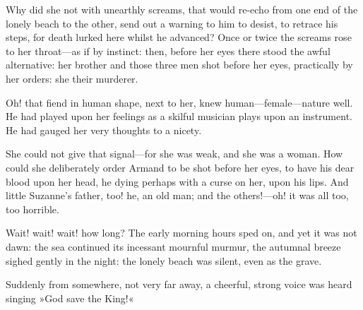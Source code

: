 Why did she not with unearthly screams, that would re-echo from one end of the lonely beach to the other, send out a warning to him to desist, to retrace his steps, for death lurked here whilst he advanced? Once or twice the screams rose to her throat—as if by instinct: then, before her eyes there stood the awful alternative: her brother and those three men shot before her eyes, practically by her orders: she their murderer.

Oh! that fiend in human shape, next to her, knew human—female—nature well. He had played upon her feelings as a skilful musician plays upon an instrument. He had gauged her very thoughts to a nicety.

She could not give that signal—for she was weak, and she was a woman. How could she deliberately order Armand to be shot before her eyes, to have his dear blood upon her head, he dying perhaps with a curse on her, upon his lips. And little Suzanne's father, too! he, an old man; and the others!—oh! it was all too, too horrible.

Wait! wait! wait! how long? The early morning hours sped on, and yet it was not dawn: the sea continued its incessant mournful murmur, the autumnal breeze sighed gently in the night: the lonely beach was silent, even as the grave.

Suddenly from somewhere, not very far away, a cheerful, strong voice was heard singing »God save the King!«